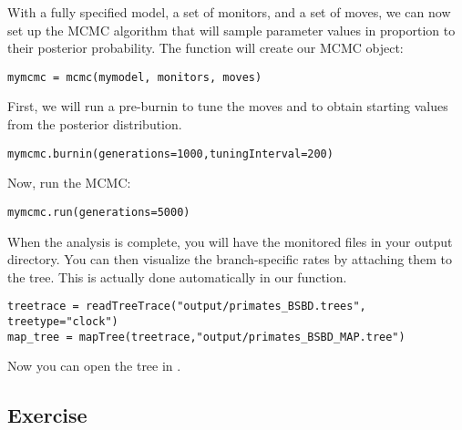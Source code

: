 With a fully specified model, a set of monitors, and a set of moves, we can now set up the MCMC algorithm that will sample parameter values in proportion to their posterior probability.
The  function will create our MCMC object:
{\tt \begin{snugshade*}
\begin{lstlisting}
mymcmc = mcmc(mymodel, monitors, moves)
\end{lstlisting}
\end{snugshade*}}

First, we will run a pre-burnin to tune the moves and to obtain starting values from the posterior distribution.
{\tt \begin{snugshade*}
\begin{lstlisting}
mymcmc.burnin(generations=1000,tuningInterval=200)
\end{lstlisting}
\end{snugshade*}}

Now, run the MCMC:
{\tt \begin{snugshade*}
\begin{lstlisting}
mymcmc.run(generations=5000)
\end{lstlisting}
\end{snugshade*}}

When the analysis is complete, you will have the monitored files in your output directory.
You can then visualize the branch-specific rates by attaching them to the tree.
This is actually done automatically in our  function.
{\tt \begin{snugshade*}
\begin{lstlisting}
treetrace = readTreeTrace("output/primates_BSBD.trees", treetype="clock")
map_tree = mapTree(treetrace,"output/primates_BSBD_MAP.tree")
\end{lstlisting}
\end{snugshade*}}
Now you can open the tree in \FigTree.




\subsection{Exercise}

